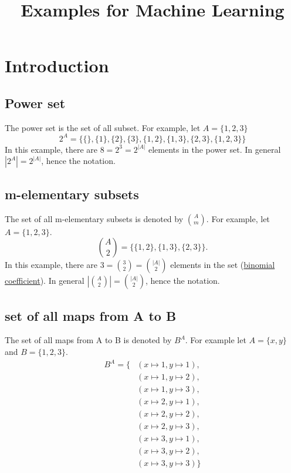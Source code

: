 \documentclass{article}
\title{Examples for Machine Learning}
\begin{document}
\maketitle


\newpage

\section{Introduction}

\subsection{Power set}
The power set is the set of all subset.
For example, let $A = \{1, 2, 3\}$
\begin{equation*}
2^A = \{ \{\}, \{1\}, \{2\}, \{3\}, \{1, 2\}, \{1,3\}, \{2,3\}, \{1,2,3\}\}    
\end{equation*}
In this example, there are $8 = 2^3 = 2^{|A|}$ elements in the power set.
In general $|2^A| = 2^{|A|}$, hence the notation.

\subsection{m-elementary subsets}
The set of all m-elementary subsets is denoted by $\binom{A}{m}$.
For example, let $A = \{1, 2, 3\}$.
\begin{equation*}
    \binom{A}{2} = \{ \{1, 2\}, \{1,3\}, \{2,3\} \}.
\end{equation*}
In this example, there are $3 = \binom{3}{2} = \binom{|A|}{2}$ elements in the set (\href{https://en.wikipedia.org/wiki/Binomial_coefficient}{binomial coefficient}).
In general $ |\binom{A}{2}| = \binom{|A|}{2}$, hence the notation.

\subsection{set of all maps from A to B}
The set of all maps from A to B is denoted by $B^A$.
For example let $A = \{x, y\}$ and $B = \{1, 2, 3\}$.
\begin{equation*}
    \begin{split}
        B^A = \{&(x \mapsto 1, y \mapsto 1), \\
        &(x \mapsto 1, y \mapsto 2), \\
        &(x \mapsto 1, y \mapsto 3), \\
        &(x \mapsto 2, y \mapsto 1), \\
        &(x \mapsto 2, y \mapsto 2), \\
        &(x \mapsto 2, y \mapsto 3), \\
        &(x \mapsto 3, y \mapsto 1), \\
        &(x \mapsto 3, y \mapsto 2), \\
        &(x \mapsto 3, y \mapsto 3)\}
    \end{split}
\end{equation*}
\end{document}
